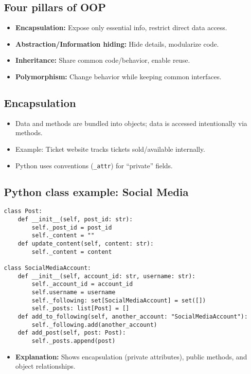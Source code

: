 \documentclass[11pt,a4paper]{article}
\begin{document}
\subsection*{Four pillars of OOP}
\begin{itemize}
    \item \textbf{Encapsulation:} Expose only essential info, restrict direct data access.
    \item \textbf{Abstraction/Information hiding:} Hide details, modularize code.
    \item \textbf{Inheritance:} Share common code/behavior, enable reuse.
    \item \textbf{Polymorphism:} Change behavior while keeping common interfaces.
\end{itemize}

\subsection*{Encapsulation}
\begin{itemize}
    \item Data and methods are bundled into objects; data is accessed intentionally via methods.
    \item Example: Ticket website tracks tickets sold/available internally.
    \item Python uses conventions (\texttt{\_attr}) for ``private'' fields.
\end{itemize}

\subsection*{Python class example: Social Media}
\begin{verbatim}
class Post:
    def __init__(self, post_id: str):
        self._post_id = post_id
        self._content = ""
    def update_content(self, content: str):
        self._content = content

class SocialMediaAccount:
    def __init__(self, account_id: str, username: str):
        self._account_id = account_id
        self.username = username
        self._following: set[SocialMediaAccount] = set([])
        self._posts: list[Post] = []
    def add_to_following(self, another_account: "SocialMediaAccount"):
        self._following.add(another_account)
    def add_post(self, post: Post):
        self._posts.append(post)
\end{verbatim}
\begin{itemize}
    \item \textbf{Explanation:} Shows encapsulation (private attributes), public methods, and object relationships.
\end{itemize}
\end{document}
